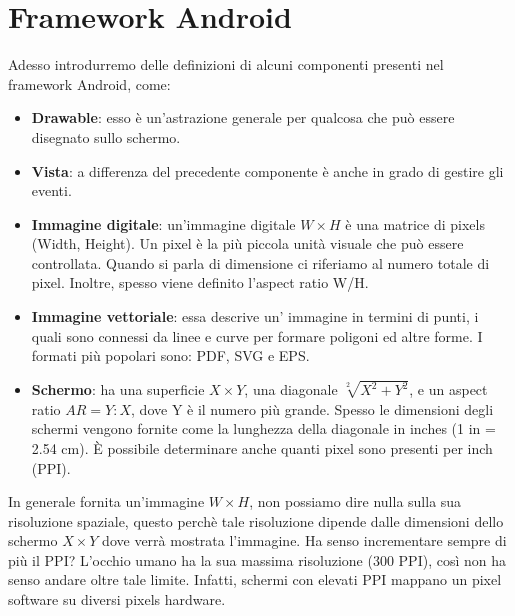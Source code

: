 \chapter{Framework Android}
Adesso introdurremo delle definizioni di alcuni componenti presenti nel framework Android, come:
\begin{itemize}
    \item \textbf{Drawable}: esso è un'astrazione generale per qualcosa che può essere disegnato sullo schermo.
    \item \textbf{Vista}: a differenza del precedente componente è anche in grado di gestire gli eventi.
    \item \textbf{Immagine digitale}: un'immagine digitale $W \times H$ è una matrice di pixels (Width, Height). Un pixel è la più piccola unità visuale che può essere controllata. Quando si parla di dimensione ci riferiamo al numero totale di pixel. Inoltre, spesso viene definito l'aspect ratio W/H.
    \item \textbf{Immagine vettoriale}: essa descrive un' immagine in termini di punti, i quali sono connessi da linee e curve per formare poligoni ed altre forme. I formati più popolari sono: PDF, SVG e EPS.
    \item \textbf{Schermo}: ha una superficie $X \times Y$, una diagonale $\sqrt[2]{X^2 + Y^2}$, e un aspect ratio $AR = Y : X$, dove Y è il numero più grande. Spesso le dimensioni degli schermi vengono fornite come la lunghezza della diagonale in inches (1 in = 2.54 cm). È possibile determinare anche quanti pixel sono presenti per inch (PPI).
\end{itemize}

In generale fornita un'immagine $W \times H$, non possiamo dire nulla sulla sua risoluzione spaziale, questo perchè tale risoluzione dipende dalle dimensioni dello schermo $X \times Y$ dove verrà mostrata l'immagine.
Ha senso incrementare sempre di più il PPI? L'occhio umano ha la sua massima risoluzione (300 PPI), così non ha senso andare oltre tale limite.
Infatti, schermi con elevati PPI mappano un pixel software su diversi pixels hardware.

